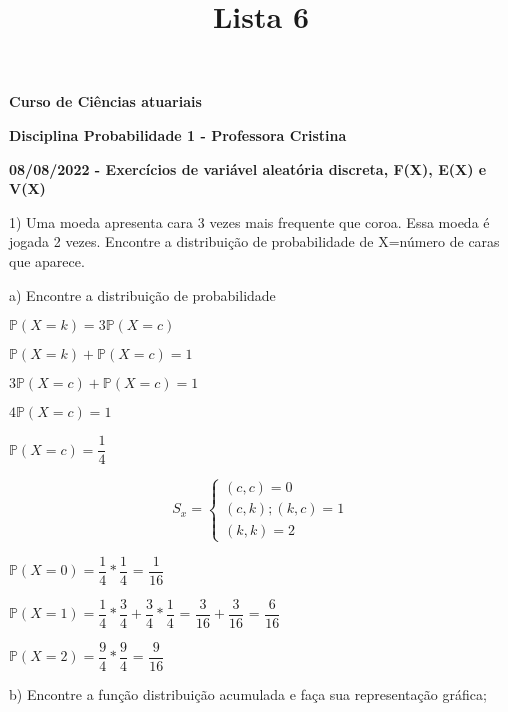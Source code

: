 \documentclass[12pt,a4paper]{article}
\title{Lista 6}
\date{}
\begin{document}
	
\maketitle
\begin{center}
\textbf{Curso de Ciências atuariais}

\textbf{Disciplina Probabilidade 1 - Professora Cristina}

\textbf{08/08/2022  - Exercícios de variável aleatória discreta, F(X), E(X) e V(X)}
\end{center}

\vspace{1cm}
1) Uma moeda apresenta cara 3 vezes mais frequente que coroa. Essa moeda é jogada 2 vezes. Encontre a distribuição de probabilidade de X=número de caras que aparece.

a) Encontre a distribuição de probabilidade

\begin{center}
\vspace{0.25cm}
$\mathbb{P}(X=k) = 3\mathbb{P}(X=c)$

\vspace{1cm}
$\mathbb{P}(X=k) + \mathbb{P}(X=c) = 1$

$3\mathbb{P}(X=c) + \mathbb{P}(X=c) = 1$

$4\mathbb{P}(X=c) = 1$

$\mathbb{P}(X=c) = \dfrac{1}{4}$

\[
S_{x} =
\begin{cases}
(c,c) = 0 \\
(c,k);(k,c) = 1\\
(k,k) = 2
\end{cases}
\]

\vspace{0.5cm}
$\mathbb{P}(X=0) = \dfrac{1}{4}*\dfrac{1}{4}$ = $\dfrac{1}{16}$

\vspace{0.5cm}
$\mathbb{P}(X=1) = \dfrac{1}{4}*\dfrac{3}{4} + \dfrac{3}{4}*\dfrac{1}{4}$ = $\dfrac{3}{16} + \dfrac{3}{16}$ = $\dfrac{6}{16}$

\vspace{0.5cm}
$\mathbb{P}(X=2) = \dfrac{9}{4}*\dfrac{9}{4}$ = $\dfrac{9}{16}$
\end{center}

\vspace{1cm}
b) Encontre a função distribuição acumulada e faça sua representação gráfica;
\end{document}
